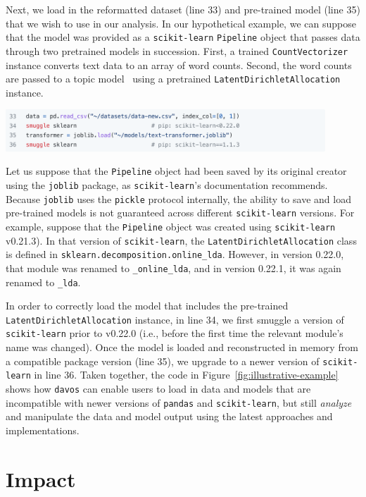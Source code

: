 \documentclass[preprint,12pt,a4paper]{elsarticle}
\begin{document}
Next, we load in the reformatted dataset (line 33) and pre-trained
model (line 35) that we wish to use in our analysis.  In our
hypothetical example, we can suppose that the model was provided as a
\texttt{scikit-learn} \texttt{Pipeline} object that passes data
through two pretrained models in succession.  First, a trained \texttt{CountVectorizer}
instance converts text data to an array of word counts.  Second, the
word counts are passed to a topic model~\cite{BleiEtal03} using a
pretrained \texttt{LatentDirichletAllocation} instance.
\begin{center}
\includegraphics[width=0.9\textwidth]{figs/example7}
\end{center}
Let us suppose that the \texttt{Pipeline} object had been saved by its
original creator using the \texttt{joblib} package, as
\texttt{scikit-learn}'s documentation recommends.  Because
\texttt{joblib} uses the \texttt{pickle} protocol internally, the
ability to save and load pre-trained models is not guaranteed across
different \texttt{scikit-learn} versions.  For example, suppose that
the \texttt{Pipeline} object was created using \texttt{scikit-learn}
v0.21.3).  In that version of \texttt{scikit-learn}, the
\texttt{LatentDirichletAllocation} class is defined in
\texttt{sklearn.decomposition.online\_lda}.  However, in version
0.22.0, that module was renamed to \texttt{\_online\_lda}, and in
version 0.22.1, it was again renamed to \texttt{\_lda}.

In order to correctly load the model that includes the pre-trained
\texttt{LatentDirichletAllocation} instance, in line 34, we first
smuggle a version of \texttt{scikit-learn} prior to v0.22.0 (i.e.,
before the first time the relevant module's name was changed).  Once
the model is loaded and reconstructed in memory from a compatible
package version (line 35), we upgrade to a newer version of
\texttt{scikit-learn} in line 36.  Taken together, the code in
Figure~\ref{fig:illustrative-example} shows how \texttt{davos} can
enable users to load in data and models that are incompatible with
newer versions of \texttt{pandas} and \texttt{scikit-learn}, but still
\textit{analyze} and manipulate the data and model output using the
latest approaches and implementations.


\section{Impact}
\end{document}
